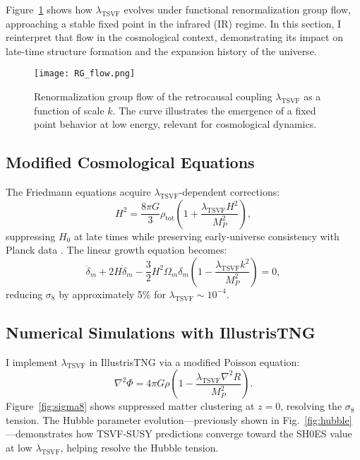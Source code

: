 \documentclass[twocolumn,superscriptaddress,floatfix]{revtex4-2}
\begin{document}
Figure~\ref{fig:rg_flow} shows how $\lambda_{\text{TSVF}}$ evolves under functional renormalization group flow, approaching a stable fixed point in the infrared (IR) regime. In this section, I reinterpret that flow in the cosmological context, demonstrating its impact on late-time structure formation and the expansion history of the universe.

\begin{figure}[htbp]
\centering
\texttt{[image: RG\_flow.png]}
\caption{Renormalization group flow of the retrocausal coupling $\lambda_{\text{TSVF}}$ as a function of scale $k$. The curve illustrates the emergence of a fixed point behavior at low energy, relevant for cosmological dynamics.}
\label{fig:rg_flow}
\end{figure}


\subsection{Modified Cosmological Equations}
\label{subsec:cosmo_eqns}

The Friedmann equations acquire $\lambda_{\text{TSVF}}$-dependent corrections:
\begin{equation}
H^2 = \frac{8\pi G}{3} \rho_{\text{tot}} \left(1 + \frac{\lambda_{\text{TSVF}} H^2}{M_P^2}\right),
\label{eq:friedmann}
\end{equation}
suppressing $H_0$ at late times while preserving early-universe consistency with Planck data \cite{Planck:2018}. The linear growth equation becomes:
\begin{equation}
\ddot{\delta}_m + 2H\dot{\delta}_m - \frac{3}{2}H^2\Omega_m \delta_m \left(1 - \frac{\lambda_{\text{TSVF}} k^2}{M_P^2}\right) = 0,
\label{eq:growth}
\end{equation}
reducing $\sigma_8$ by approximately 5\% for $\lambda_{\text{TSVF}} \sim 10^{-4}$.

\subsection{Numerical Simulations with IllustrisTNG}
\label{subsec:cosmo_sim}

I implement $\lambda_{\text{TSVF}}$ in IllustrisTNG \cite{Springel:2018} via a modified Poisson equation:
\begin{equation}
\nabla^2 \Phi = 4\pi G \rho \left(1 - \frac{\lambda_{\text{TSVF}} \nabla^2 R}{M_P^2}\right).
\label{eq:poisson}
\end{equation}
Figure~\ref{fig:sigma8} shows suppressed matter clustering at $z = 0$, resolving the $\sigma_8$ tension. The Hubble parameter evolution—previously shown in Fig.~\ref{fig:hubble}—demonstrates how TSVF-SUSY predictions converge toward the SH0ES value at low $\lambda_{\text{TSVF}}$, helping resolve the Hubble tension.
\end{document}
